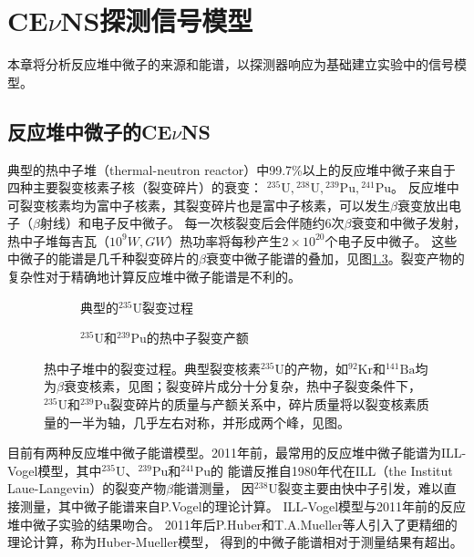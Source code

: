 
\chapter{CE$\nu$NS探测信号模型}

本章将分析反应堆中微子的来源和能谱，以探测器响应为基础建立实验中的信号模型。

\section{反应堆中微子的CE$\nu$NS}

典型的热中子堆（thermal-neutron reactor）中99.7\%以上的反应堆中微子来自于四种主要裂变核素子核（裂变碎片）的衰变：
${}^{235}\mathrm{U},{}^{238}\mathrm{U},{}^{239}\mathrm{Pu},{}^{241}\mathrm{Pu}$\cite{juno_collaboration_tao_2020}。
反应堆中可裂变核素均为富中子核素，其裂变碎片也是富中子核素，可以发生$\beta$衰变放出电子（$\beta$射线）和电子反中微子。
每一次核裂变后会伴随约6次$\beta$衰变和中微子发射，热中子堆每吉瓦（$10^{9}\si{W},\si{GW}$）热功率将每秒产生$2\times10^{20}$个电子反中微子。
这些中微子的能谱是几千种裂变碎片的$\beta$衰变中微子能谱的叠加，见图\ref{fig:fission}。裂变产物的复杂性对于精确地计算反应堆中微子能谱是不利的。

\begin{figure}
  \begin{subfigure}{.3\textwidth}
    \centering
    
    \caption{\label{fig:nuclear_fission} 典型的${}^{235}\mathrm{U}$裂变过程}
  \end{subfigure}
  \begin{subfigure}{.7\textwidth}
    \centering
    
    \caption{\label{fig:fission_yield} ${}^{235}\mathrm{U}$和${}^{239}\mathrm{Pu}$的热中子裂变产额}
  \end{subfigure}
  \caption{\label{fig:fission} 热中子堆中的裂变过程。典型裂变核素${}^{235}\mathrm{U}$的产物，如${}^{92}\mathrm{Kr}$和${}^{141}\mathrm{Ba}$均为$\beta$衰变核素，见图；裂变碎片成分十分复杂，热中子裂变条件下，${}^{235}\mathrm{U}$和${}^{239}\mathrm{Pu}$裂变碎片的质量与产额关系中，碎片质量将以裂变核素质量的一半为轴，几乎左右对称，并形成两个峰\cite{crouch_fission-product_1977}，见图。}
\end{figure}

目前有两种反应堆中微子能谱模型。2011年前，最常用的反应堆中微子能谱为ILL-Vogel模型，其中${}^{235}\mathrm{U}$、${}^{239}\mathrm{Pu}$和${}^{241}\mathrm{Pu}$的
能谱反推自1980年代在ILL（the Institut Laue-Langevin）的裂变产物$\beta$能谱测量\cite{von_feilitzsch_experimental_1982,schreckenbach_determination_1985,hahn_antineutrino_1989}，
因${}^{238}\mathrm{U}$裂变主要由快中子引发，难以直接测量，其中微子能谱来自P.Vogel的理论计算\cite{p_vogel_neutrino_1989}。
ILL-Vogel模型与2011年前的反应堆中微子实验的结果吻合\cite{an_improved_2017}。
2011年后P.Huber和T.A.Mueller等人引入了更精细的理论计算\cite{huber_determination_2011,mueller_improved_2011}，称为Huber-Mueller模型，
得到的中微子能谱相对于测量结果有超出。

